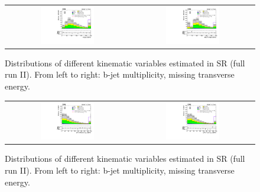 \begin{figure}[tbh!]
 \begin{center}
 \begin{tabular}{cc}
  \includegraphics[width=0.45\textwidth]{figures/Part3/Nonprompt/SR/Memu}&
 \includegraphics[width=0.45\textwidth]{figures/Part3/Nonprompt/SR/LFVTopmass} \\
 \end{tabular}
 \caption{Distributions of different kinematic variables estimated in SR (full run II). From left to right: b-jet multiplicity, missing transverse energy.}
 \label{fig:SR_DataDriven_1}
 \end{center}
\end{figure}

\begin{figure}[tbh!]
 \begin{center}
 \begin{tabular}{cc}
  \includegraphics[width=0.45\textwidth]{figures/Part3/Nonprompt/SR/LFVePt}&
 \includegraphics[width=0.45\textwidth]{figures/Part3/Nonprompt/SR/LFVmuPt} \\
 \end{tabular}
 \caption{Distributions of different kinematic variables estimated in SR (full run II). From left to right: b-jet multiplicity, missing transverse energy.}
 \label{fig:SR_DataDriven_2}
 \end{center}
\end{figure}

